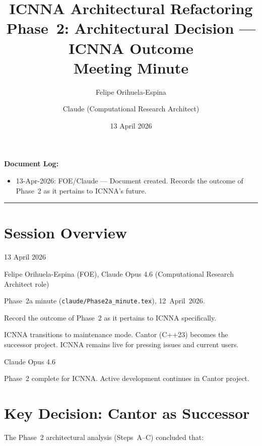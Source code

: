 \documentclass[11pt,a4paper]{article}
\title{ICNNA Architectural Refactoring\\Phase~2: Architectural Decision --- ICNNA Outcome\\
\large Meeting Minute}
\author{Felipe Orihuela-Espina \and Claude (Computational Research Architect)}
\date{13 April 2026}
\begin{document}
\maketitle

\noindent\textbf{Document Log:}
\begin{itemize}[nosep]
    \item 13-Apr-2026: FOE/Claude --- Document created. Records the outcome of Phase~2 as it pertains to ICNNA's future.
\end{itemize}

\vspace{1em}
\hrule
\vspace{1em}

\section{Session Overview}

\begin{description}[style=nextline]
    \item[Date:] 13 April 2026
    \item[Participants:] Felipe Orihuela-Espina (FOE), Claude Opus 4.6 (Computational Research Architect role)
    \item[Predecessor:] Phase~2a minute (\texttt{claude/Phase2a\_minute.tex}), 12~April~2026.
    \item[Objective:] Record the outcome of Phase~2 as it pertains to ICNNA specifically.
    \item[Outcome:] ICNNA transitions to maintenance mode. Cantor (C++23) becomes the successor project. ICNNA remains live for pressing issues and current users.
    \item[Model used:] Claude Opus 4.6
    \item[Status:] Phase~2 complete for ICNNA. Active development continues in Cantor project.
\end{description}

\section{Key Decision: Cantor as Successor}

The Phase~2 architectural analysis (Steps~A--C) concluded that:
\end{document}
